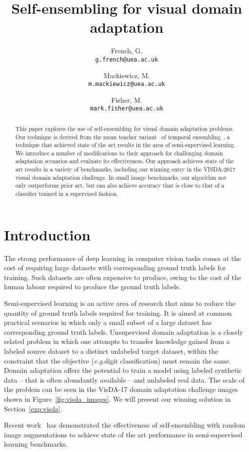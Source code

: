 \documentclass{article}
\title{Self-ensembling for visual domain adaptation}
\author{
  French, G.\\
  \texttt{g.french@uea.ac.uk}
  \and
  Mackiewicz, M.\\
  \texttt{m.mackiewicz@uea.ac.uk}
  \and
  Fisher, M.\\
  \texttt{mark.fisher@uea.ac.uk}
}
\newcommand{\eg}{\textit{e.g}.}
\begin{document}
\maketitle

\begin{abstract}
This paper explores the use of self-ensembling for visual domain adaptation problems. Our technique is derived from the mean teacher variant~\cite{Tarvainen:Mean} of temporal ensembling~\cite{Laine:Temporal}, a technique that achieved state of the art results in the area of semi-supervised learning. We introduce a number of modifications to their approach for challenging domain adaptation scenarios and evaluate its effectiveness. Our approach achieves state of the art results in a variety of benchmarks, including our winning entry in the VISDA-2017 visual domain adaptation challenge. In small image benchmarks, our algorithm not only outperforms prior art, but can also achieve accuracy that is close to that of a classifier trained in a supervised fashion.
\end{abstract}


\section{Introduction}
\label{sec:intro}
The strong performance of deep learning in computer vision tasks comes at the cost of requiring large datasets with corresponding ground truth labels for training. Such datasets are often expensive to produce, owing to the cost of the human labour required to produce the ground truth labels.

Semi-supervised learning is an active area of research that aims to reduce the quantity of ground truth labels required for training. It is aimed at common practical scenarios in which only a small subset of a large dataset has corresponding ground truth labels. Unsupervised domain adaptation is a closely related problem in which one attempts to transfer knowledge gained from a labeled source dataset to a distinct unlabeled target dataset, within the constraint that the objective (\eg digit classification) must remain the same. Domain adaptation offers the potential to train a model using labeled synthetic data -- that is often abundantly available -- and unlabeled real data. The scale of the problem can be seen in the VisDA-17 domain adaptation challenge images shown in Figure~\ref{fig:visda_images}. We will present our winning solution in Section~\ref{exp:visda}.

Recent work~\cite{Tarvainen:Mean} has demonstrated the effectiveness of self-ensembling with random image augmentations to achieve state of the art performance in semi-supervised learning benchmarks.
\end{document}

